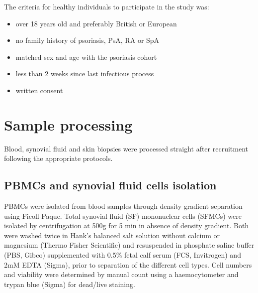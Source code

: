 The criteria for healthy individuals to participate in the study was:
\begin{itemize}
  \item over 18 years old and preferably British or European
  \item no family history of psoriasis, PsA, RA or SpA
	\item matched sex and age with the psoriasis cohort
	\item less than 2 weeks since last infectious process
	\item written consent
\end{itemize}


\section{Sample processing}
\label{sample_processing}
Blood, synovial fluid and skin biopsies were processed straight after recruitment following the appropriate protocols.

\subsection{PBMCs and synovial fluid cells isolation}
PBMCs were isolated from blood samples through density gradient separation using Ficoll-Paque. Total synovial fluid (SF) mononuclear cells (SFMCs) were isolated by centrifugation at 500g for 5 min in absence of density gradient. Both were washed twice in Hank’s balanced salt solution without calcium or magnesium (Thermo Fisher Scientific) and resuspended in phosphate saline buffer (PBS, Gibco) supplemented with 0.5\% fetal calf serum (FCS, Invitrogen) and 2mM EDTA (Sigma), prior to separation of the different cell types. Cell numbers and viability were determined by manual count using a haemocytometer and trypan blue (Sigma) for dead/live staining.


